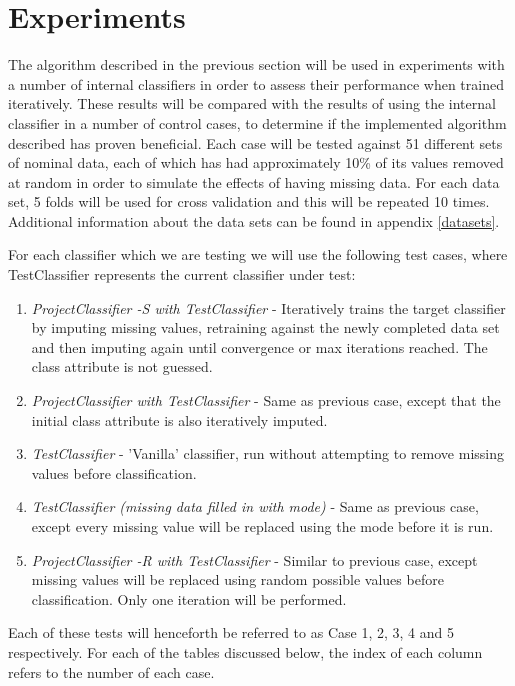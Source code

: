 \newpage
\chapter{Experiments}
The algorithm described in the previous section will be used in experiments with a number of internal classifiers in order to assess their performance when trained iteratively. These results will be compared with the results of using the internal classifier in a number of control cases, to determine if the implemented algorithm described has proven beneficial. Each case will be tested against 51 different sets of nominal data, each of which has had approximately 10\% of its values removed at random in order to simulate the effects of having missing data. For each data set, 5 folds will be used for cross validation and this will be repeated 10 times. Additional information about the data sets can be found in appendix \ref{datasets}.

For each classifier which we are testing we will use the following test cases, where TestClassifier represents the current classifier under test:

\begin{enumerate}
\item \textit{ProjectClassifier -S with TestClassifier} - Iteratively trains the target classifier by imputing missing values, retraining against the newly completed data set and then imputing again until convergence or max iterations reached. The class attribute is not guessed.
\item \textit{ProjectClassifier with TestClassifier} - Same as previous case, except that the initial class attribute is also iteratively imputed.
\item \textit{TestClassifier} - 'Vanilla' classifier, run without attempting to remove missing values before classification.
\item \textit{TestClassifier (missing data filled in with mode)} - Same as previous case, except every missing value will be replaced using the mode before it is run.
\item \textit{ProjectClassifier -R with TestClassifier} - Similar to previous case, except missing values will be replaced using random possible values before classification. Only one iteration will be performed.
\end{enumerate}

Each of these tests will henceforth be referred to as Case 1, 2, 3, 4 and 5 respectively. For each of the tables discussed below, the index of each column refers to the number of each case. 

